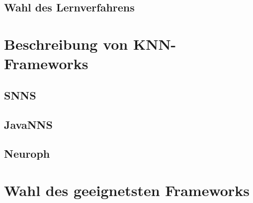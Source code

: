 \subsection{Wahl des Lernverfahrens} 
\label{subsection:Wahl des Lernverfahrens} 


\section{Beschreibung von KNN-Frameworks} %
\label{section:Beschreibung von Frameworks} %

\subsection{SNNS} %
\label{subsection:SNNS} %

\subsection{JavaNNS}  %
\label{subsection:JavaNNS}  %

\subsection{Neuroph} %
\label{subsection:Neuroph} %

\section{Wahl des geeignetsten Frameworks} %
\label{section:Wahl des geeignetsten Frameworks} %

